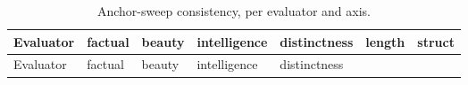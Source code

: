 \begin{longtable}[]{@{}
  >{\raggedright\arraybackslash}p{}
  >{\raggedleft\arraybackslash}p{}
  >{\raggedleft\arraybackslash}p{}
  >{\raggedleft\arraybackslash}p{}
  >{\raggedleft\arraybackslash}p{}
  >{\raggedleft\arraybackslash}p{}
  >{\raggedleft\arraybackslash}p{}@{}}
\caption{Anchor-sweep consistency, per evaluator and axis.}\tabularnewline
\toprule\noalign{}
\begin{minipage}[b]{\linewidth}\raggedright
Evaluator
\end{minipage} & \begin{minipage}[b]{\linewidth}\raggedleft
factual
\end{minipage} & \begin{minipage}[b]{\linewidth}\raggedleft
beauty
\end{minipage} & \begin{minipage}[b]{\linewidth}\raggedleft
intelligence
\end{minipage} & \begin{minipage}[b]{\linewidth}\raggedleft
distinctness
\end{minipage} & \begin{minipage}[b]{\linewidth}\raggedleft
length
\end{minipage} & \begin{minipage}[b]{\linewidth}\raggedleft
struct
\end{minipage} \\
\midrule\noalign{}
\endfirsthead
\toprule\noalign{}
\begin{minipage}[b]{\linewidth}\raggedright
Evaluator
\end{minipage} & \begin{minipage}[b]{\linewidth}\raggedleft
factual
\end{minipage} & \begin{minipage}[b]{\linewidth}\raggedleft
beauty
\end{minipage} & \begin{minipage}[b]{\linewidth}\raggedleft
intelligence
\end{minipage} & \begin{minipage}[b]{\linewidth}\raggedleft
distinctness
\end{minipage} & \begin{minipage}[b]{\linewidth}\raggedleft

\end{minipage}
\end{longtable}
